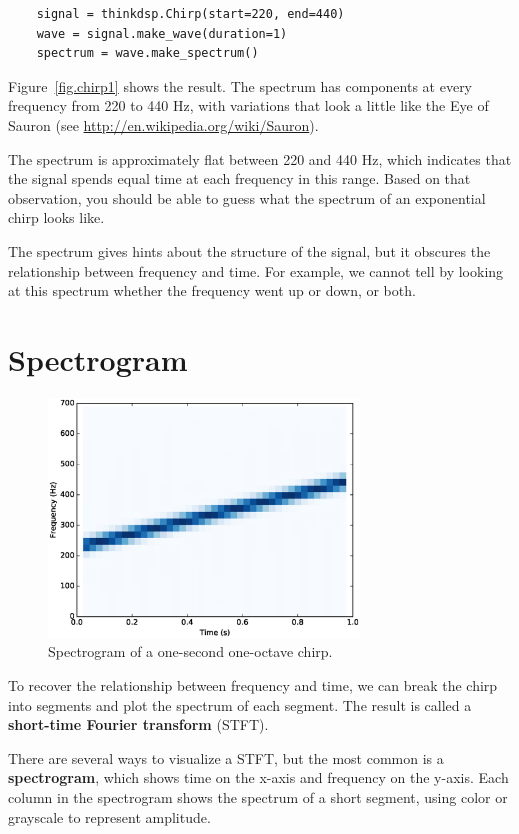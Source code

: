 \documentclass[12pt]{book}
\begin{document}
\begin{verbatim}
    signal = thinkdsp.Chirp(start=220, end=440)
    wave = signal.make_wave(duration=1)
    spectrum = wave.make_spectrum()
\end{verbatim}

Figure~\ref{fig.chirp1} shows the result.  The spectrum has
components at every frequency from 220 to 440 Hz, with variations
that look a little like the Eye of Sauron
(see \url{http://en.wikipedia.org/wiki/Sauron}).

The spectrum is approximately flat between 220 and 440 Hz, which
indicates that the signal spends equal time at each frequency in this
range.  Based on that observation, you should be able to guess what
the spectrum of an exponential chirp looks like.

The spectrum gives hints about the structure of the signal,
but it obscures the relationship between frequency and time.
For example, we cannot tell by looking at this spectrum whether
the frequency went up or down, or both.


\section{Spectrogram}

\begin{figure}
\centerline{\includegraphics[height=2.5in]{figs/chirp2.eps}}
\caption{Spectrogram of a one-second one-octave chirp.}
\label{fig.chirp2}
\end{figure}

To recover the relationship between frequency and time, we can break
the chirp into segments and plot the spectrum of each segment.  The
result is called a {\bf short-time Fourier transform} (STFT).

There are several ways to visualize a STFT, but the most common
is a {\bf spectrogram}, which shows time on the x-axis and frequency
on the y-axis.  Each column in the spectrogram shows the spectrum of
a short segment, using color or grayscale to represent amplitude.
\end{document}
